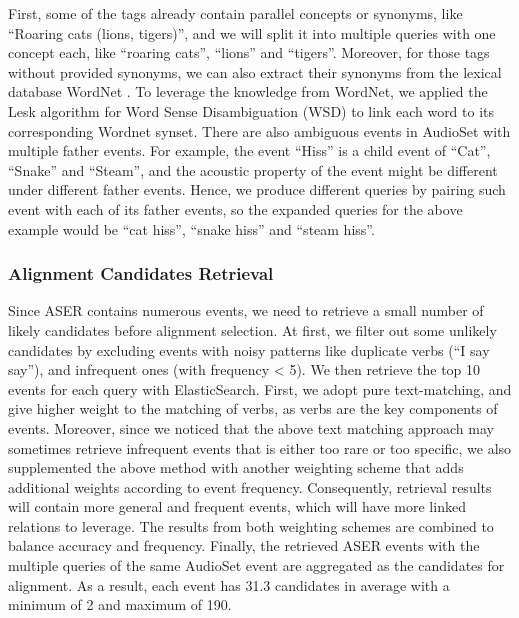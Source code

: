 First, some of the tags already contain parallel concepts or synonyms, like ``Roaring cats (lions, tigers)'', and we will split it into multiple queries with one concept each, like ``roaring cats'', ``lions'' and ``tigers''. 
Moreover, for those tags without provided synonyms, we can also extract their synonyms from the lexical database WordNet \citep{miller1995wordnet}. To leverage the knowledge from WordNet, we applied the Lesk algorithm \citep{lesk1986automatic} for Word Sense Disambiguation (WSD) to link each word to its corresponding Wordnet synset. %
There are also ambiguous events in AudioSet with multiple father events. For example, the event ``Hiss'' is a child event of ``Cat'', ``Snake'' and ``Steam'', and the acoustic property of the event might be different under different father events. Hence, we produce different queries by pairing such event with each of its father events, so the expanded queries for the above example would be ``cat hiss'', ``snake hiss'' and ``steam hiss''.

\subsubsection{Alignment Candidates Retrieval}
\label{sec:cand-retrieval}

Since ASER contains numerous events, we need to retrieve a small number of likely candidates before alignment selection. At first, we filter out some unlikely candidates by excluding events with noisy patterns like duplicate verbs (``I say say''), and infrequent ones (with frequency < 5). We then retrieve the top 10 events for each query with ElasticSearch. First, we adopt pure text-matching, and give higher weight to the matching of verbs, as verbs are the key components of events. Moreover, since we noticed that the above text matching approach may sometimes retrieve infrequent events that is either too rare or too specific, we also supplemented the above method with another weighting scheme that adds additional weights according to event frequency. Consequently, retrieval results will contain more general and frequent events, which will have more linked relations to leverage. The results from both weighting schemes are combined to balance accuracy and frequency. 
Finally, the retrieved ASER events with the multiple queries of the same AudioSet event are
aggregated as the candidates for alignment. As a result, each event has 31.3 candidates in average with a minimum of 2 and maximum of 190. 

